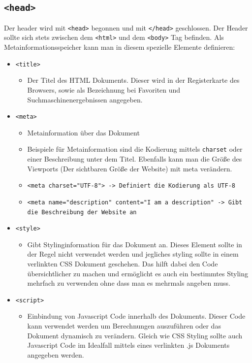 \documentclass{article}
\begin{document}
	\subsection{\texttt{<head>}}
	Der header wird mit \texttt{<head>} begonnen und mit \texttt{</head>} geschlossen. Der Header sollte sich stets zwischen dem \texttt{<html>} und dem \texttt{<body>} Tag befinden. Als Metainformationsspeicher kann man in diesem spezielle Elemente definieren:
	\begin{itemize}
		\item{\texttt{<title>}}
		\begin{itemize}
			\item{Der Titel des HTML Dokuments. Dieser wird in der Registerkarte des Browsers, sowie als Bezeichnung bei Favoriten und Suchmaschinenergebnissen angegeben.}
		\end{itemize}
		\item{\texttt{<meta>}}
		\begin{itemize}
			\item{Metainformation über das Dokument}
			\item{Beispiele für Metainformation sind die Kodierung mittels \texttt{charset} oder einer Beschreibung unter dem Titel. Ebenfalls kann man die Größe des Viewports (Der sichtbaren Größe der Website) mit meta verändern.}
			\item{\texttt{<meta charset="UTF-8"> -> Definiert die Kodierung als UTF-8}}
			\item{\texttt{<meta name="description" content="I am a description" -> Gibt die Beschreibung der Website an}}
		\end{itemize}
		\item{\texttt{<style>}}
		\begin{itemize}
			\item{Gibt Stylinginformation für das Dokument an. Dieses Element sollte in der Regel nicht verwendet werden und jegliches styling sollte in einem verlinkten CSS Dokument geschehen. Das hilft dabei den Code übersichtlicher zu machen und ermöglicht es auch ein bestimmtes Styling mehrfach zu verwenden ohne dass man es mehrmals angeben muss.}
		\end{itemize}
		\item{\texttt{<script>}}
		\begin{itemize}
			\item{Einbindung von Javascript Code innerhalb des Dokuments. Dieser Code kann verwendet werden um Berechnungen auszuführen oder das Dokument dynamisch zu verändern. Gleich wie CSS Styling sollte auch Javascript Code im Idealfall mittels eines verlinkten .js Dokuments angegeben werden.}

\end{itemize}
\end{itemize}
\end{document}
